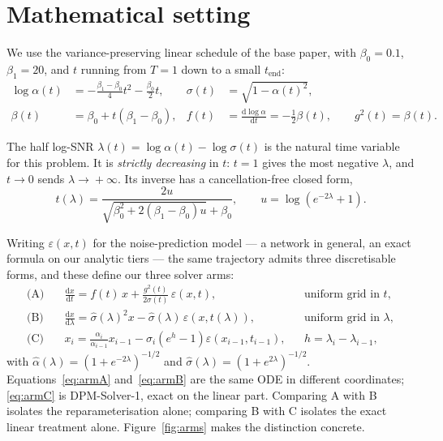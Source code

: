 \documentclass[11pt,a4paper]{article}
\newcommand{\eps}{\varepsilon}
\newcommand{\lam}{\lambda}
\begin{document}

\section{Mathematical setting}

We use the variance-preserving linear schedule of the base paper, with
$\beta_0 = 0.1$, $\beta_1 = 20$, and $t$ running from $T=1$ down to a small
$t_{\text{end}}$:
\begin{align}
\log \alpha(t) &= -\tfrac{\beta_1-\beta_0}{4}t^2 - \tfrac{\beta_0}{2}t,
&\sigma(t) &= \sqrt{1-\alpha(t)^2}, \\
\beta(t) &= \beta_0 + t(\beta_1-\beta_0),
&f(t) &= \tfrac{\mathrm{d}\log\alpha}{\mathrm{d}t} = -\tfrac{1}{2}\beta(t),
\qquad g^2(t) = \beta(t).
\end{align}

The half log-SNR $\lam(t) = \log\alpha(t) - \log\sigma(t)$ is the natural time
variable for this problem. It is \emph{strictly decreasing} in $t$: $t=1$ gives
the most negative $\lam$, and $t\!\to\!0$ sends $\lam\!\to\!+\infty$. Its inverse
has a cancellation-free closed form,
\begin{equation}
t(\lam) = \frac{2u}{\sqrt{\beta_0^2 + 2(\beta_1-\beta_0)u} + \beta_0},
\qquad u = \log\!\left(e^{-2\lam}+1\right).
\end{equation}

Writing $\eps(x,t)$ for the noise-prediction model --- a network in general, an
exact formula on our analytic tiers --- the same trajectory admits three
discretisable forms, and these define our three solver arms:
\begin{align}
\text{(A)}\quad &\frac{\mathrm{d}x}{\mathrm{d}t} = f(t)\,x + \frac{g^2(t)}{2\sigma(t)}\,\eps(x,t),
  &&\text{uniform grid in } t, \label{eq:armA}\\[2pt]
\text{(B)}\quad &\frac{\mathrm{d}x}{\mathrm{d}\lam} = \hat\sigma(\lam)^2 x - \hat\sigma(\lam)\,\eps(x,t(\lam)),
  &&\text{uniform grid in } \lam, \label{eq:armB}\\[2pt]
\text{(C)}\quad &x_i = \frac{\alpha_i}{\alpha_{i-1}}x_{i-1} - \sigma_i\left(e^{h}-1\right)\eps(x_{i-1},t_{i-1}),
  &&h = \lam_i - \lam_{i-1}, \label{eq:armC}
\end{align}
with $\hat\alpha(\lam) = (1+e^{-2\lam})^{-1/2}$ and
$\hat\sigma(\lam) = (1+e^{2\lam})^{-1/2}$. Equations~\eqref{eq:armA}
and~\eqref{eq:armB} are the same ODE in different coordinates;
\eqref{eq:armC} is DPM-Solver-1, exact on the linear part. Comparing A with B
isolates the reparameterisation alone; comparing B with C isolates the exact
linear treatment alone. Figure~\ref{fig:arms} makes the distinction concrete.
\end{document}
